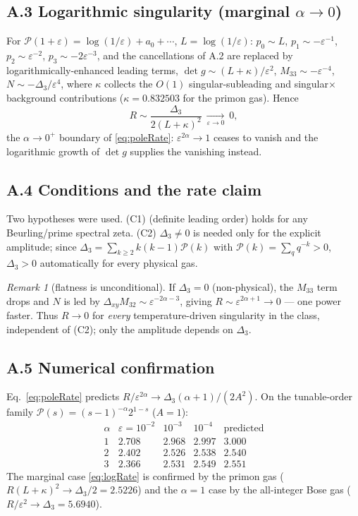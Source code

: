 \documentclass[a4paper,11pt]{article}
\theoremstyle{plain}
\theoremstyle{definition}
\theoremstyle{remark}
\newtheorem{remark}{Remark}
\newcommand{\Ric}{R}
\newcommand{\eps}{\varepsilon}
\newcommand{\detg}{\det g}
\begin{document}
\subsection*{A.3 Logarithmic singularity (marginal $\alpha\to0$)}
For $\mathcal P(1+\eps)=\log(1/\eps)+a_0+\cdots$, $L=\log(1/\eps)$: $p_0\sim L$, $p_1\sim-\eps^{-1}$,
$p_2\sim\eps^{-2}$, $p_3\sim-2\eps^{-3}$, and the cancellations of A.2 are replaced by
logarithmically-enhanced leading terms, $\detg\sim(L+\kappa)/\eps^2$, $M_{33}\sim-\eps^{-4}$,
$N\sim-\Delta_3/\eps^4$, where $\kappa$ collects the $O(1)$ singular-subleading and
singular$\times$background contributions ($\kappa=0.832503$ for the primon gas). Hence
\begin{equation}\label{eq:logRate}
   \Ric\sim\frac{\Delta_3}{2(L+\kappa)^2}\ \xrightarrow[\eps\to0]{}\ 0,
\end{equation}
the $\alpha\to0^{+}$ boundary of \eqref{eq:poleRate}: $\eps^{2\alpha}\to1$ ceases to vanish and the
logarithmic growth of $\detg$ supplies the vanishing instead.

\subsection*{A.4 Conditions and the rate claim}
Two hypotheses were used. (C1) (definite leading order) holds for any Beurling/prime spectral zeta.
(C2) $\Delta_3\ne0$ is needed only for the explicit amplitude; since
$\Delta_3=\sum_{k\ge2}k(k-1)\mathcal P(k)$ with $\mathcal P(k)=\sum_q q^{-k}>0$, $\Delta_3>0$
automatically for every physical gas.

\begin{remark}[flatness is unconditional]\label{rem:uncond}
If $\Delta_3=0$ (non-physical), the $M_{33}$ term drops and $N$ is led by
$\Delta_{xy}M_{32}\sim\eps^{-2\alpha-3}$, giving $\Ric\sim\eps^{2\alpha+1}\to0$ --- one power faster.
Thus $\Ric\to0$ for \emph{every} temperature-driven singularity in the class, independent of (C2);
only the amplitude depends on $\Delta_3$.
\end{remark}

\subsection*{A.5 Numerical confirmation}
Eq.~\eqref{eq:poleRate} predicts $\Ric/\eps^{2\alpha}\to\Delta_3(\alpha+1)/(2A^2)$. On the tunable-order
family $\mathcal P(s)=(s-1)^{-\alpha}2^{1-s}$ ($A=1$):
\[
\renewcommand{\arraystretch}{1.15}
\begin{array}{c|ccc|c}
\alpha & \eps=10^{-2} & 10^{-3} & 10^{-4} & \text{predicted}\\\hline
1 & 2.708 & 2.968 & 2.997 & 3.000\\
2 & 2.402 & 2.526 & 2.538 & 2.540\\
3 & 2.366 & 2.531 & 2.549 & 2.551
\end{array}
\]
The marginal case \eqref{eq:logRate} is confirmed by the primon gas ($\Ric(L+\kappa)^2\to\Delta_3/2=2.5226$)
and the $\alpha=1$ case by the all-integer Bose gas ($\Ric/\eps^2\to\Delta_3=5.6940$).
\end{document}

